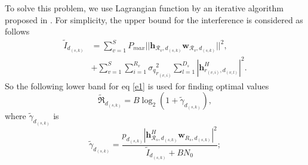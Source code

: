 \documentclass[conference,10pt,twocolumn,letter]{IEEEtran}
\begin{document}
To solve this problem, we use Lagrangian function  by an iterative algorithm proposed in \cite{11}.
For simplicity, the upper bound for the interference is considered as follows
\begin{equation}
\begin{split}
\tilde{I}_{d_{(s,k)}} &= \sum_{v=1}^{S} P_{max}|| \boldsymbol{h}_{\mathcal{R}_v,d_{(s,k)}} \boldsymbol{w}_{\mathcal{R}_v,d_{(s,k)}}||^2 ,\\
& +  \sum_{v=1}^{S} \sum_{i=1}^{{R}_v} {\sigma_q}_{r_{(v,i)}}^2 \sum_{l=1}^{{D}_s} |\boldsymbol{h}_{r_{(v,i)}, d_{(v,l)}}^H|^2.
\end{split}
\end{equation}
So the following lower band for eq \eqref{e1} is used for finding optimal values
\begin{equation}\label{e11}
\mathfrak{\tilde{R}}_{d_{(s,k)}} = B \log_2(1+\tilde{\gamma}_{d_{(s,k)}}),
\end{equation}
where $\tilde{\gamma}_{d_{(s,k)}}$ is
\begin{equation}\label{15}
\tilde{\gamma}_{d_{(s,k)}} =  \frac{p_{d_{(s,k)}}|\boldsymbol{h}_{\mathcal{R}_s, d_{(s,k)}}^H \boldsymbol{w}_{R_{s},d_{(s,k)}}|^2}{\tilde{I}_{d_{(s,k)}}+BN_0};
\end{equation}
\end{document}

